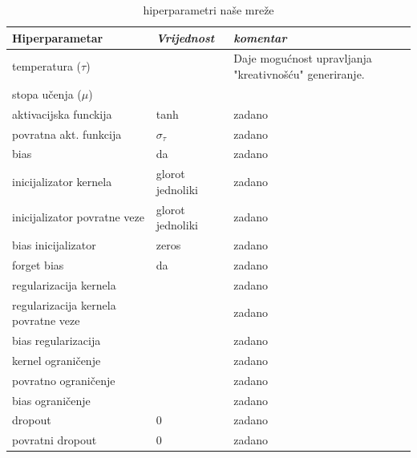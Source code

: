 \documentclass[conference]{IEEEtran}
\begin{document}
\begin{table}[htbp]
\caption{hiperparametri naše mreže}
\begin{center}
\begin{tabular}{|p{120pt}|p{40pt}|p{60pt}|}
\hline
\textbf{Hiperparametar} & \textbf{\textit{Vrijednost}} & \textbf{\textit{komentar}}\\ \hline
temperatura ($\tau$) &  & Daje mogućnost upravljanja "kreativnošću" generiranje. \\ \hline
stopa učenja ($\mu$) &  & \\ \hline \hline
aktivacijska funckija & tanh & zadano \\ \hline
povratna akt. funkcija & $\sigma_{\tau}$ & zadano \\ \hline
bias & da & zadano \\ \hline
inicijalizator kernela & glorot jednoliki & zadano \\ \hline
inicijalizator povratne veze & glorot jednoliki & zadano \\ \hline
bias inicijalizator & zeros & zadano \\ \hline
forget bias & da & zadano \\ \hline
regularizacija kernela & & zadano \\ \hline
regularizacija kernela povratne veze &  & zadano \\ \hline
bias regularizacija &  & zadano \\ \hline
kernel ograničenje &  & zadano \\ \hline
povratno ograničenje &  & zadano \\ \hline
bias ograničenje & & zadano\\ \hline
dropout & 0 & zadano \\ \hline
povratni dropout & 0 & zadano \\ \hline
\end{tabular}
\label{tab:hiper}
\end{center}
\end{table}
\end{document}
